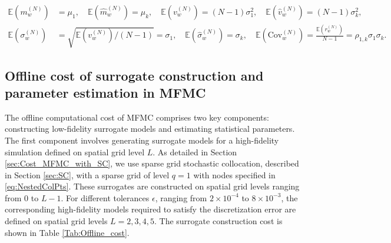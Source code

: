 %
\begin{align*}
    \mathbb{E}(m_w^{(N)})&=\mu_1,\quad \mathbb{E}(\widehat m_w^{(N)})=\mu_k, \quad \mathbb{E}(v_w^{(N)})=(N-1)\sigma_1^2, \quad\mathbb{E}(\widehat v_w^{(N)})=(N-1)\sigma_k^2, \\
    \mathbb{E}(\sigma_w^{(N)})&=\sqrt{\mathbb{E}(v_w^{(N)})/(N-1)}=\sigma_1, \quad \mathbb{E}(\widehat \sigma_w^{(N)})=\sigma_k, \quad\mathbb{E}(\text{Cov}_w^{(N)}) = \frac{\mathbb{E}( r_w^{(N)})}{N-1} = \rho_{1,k}\sigma_1\sigma_k.
\end{align*}
%

\subsection{Offline cost of surrogate construction and parameter estimation in MFMC}
The offline computational cost of MFMC comprises two key components: constructing low-fidelity surrogate models and estimating statistical parameters. The first component involves generating surrogate models for a high-fidelity simulation defined on spatial grid level $L$. As detailed in Section \ref{sec:Cost_MFMC_with_SC}, we use sparse grid stochastic collocation, described in Section \ref{sec:SC}, with a sparse grid of level $q=1$ with nodes specified in \eqref{eq:NestedColPts}. These surrogates are constructed on spatial grid levels ranging from 0 to $L-1$. For different tolerances $\epsilon$, ranging from $2\times 10^{-4}$ to $8\times 10^{-3}$, the corresponding high-fidelity models required to satisfy the discretization error are defined on spatial grid levels $L = 2,3,4,5$. The surrogate construction cost is shown in Table \ref{Tab:Offline_cost}.
%
